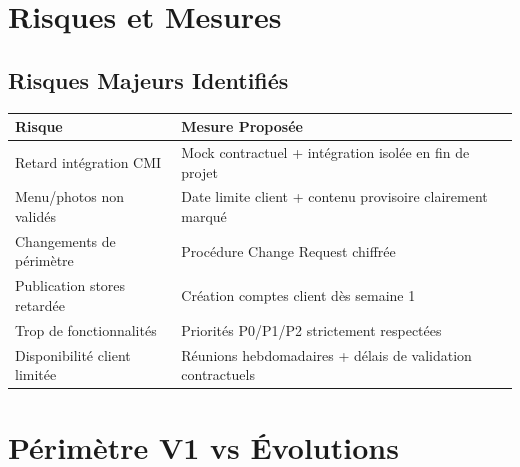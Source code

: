 \documentclass[11pt,a4paper]{article}
\begin{document}

\section{Risques et Mesures}

\subsection{Risques Majeurs Identifiés}

\begin{longtable}{|p{5cm}|p{9cm}|}
\hline
\textbf{Risque} & \textbf{Mesure Proposée} \\
\hline
Retard intégration CMI & Mock contractuel + intégration isolée en fin de projet \\
\hline
Menu/photos non validés & Date limite client + contenu provisoire clairement marqué \\
\hline
Changements de périmètre & Procédure Change Request chiffrée \\
\hline
Publication stores retardée & Création comptes client dès semaine 1 \\
\hline
Trop de fonctionnalités & Priorités P0/P1/P2 strictement respectées \\
\hline
Disponibilité client limitée & Réunions hebdomadaires + délais de validation contractuels \\
\hline
\end{longtable}

\section{Périmètre V1 vs Évolutions}
\end{document}
